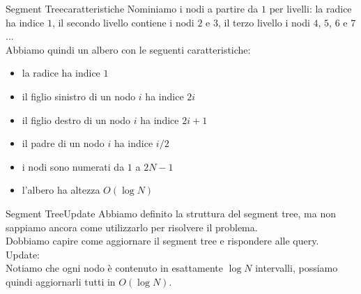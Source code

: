 \documentclass[compress]{beamer}
\begin{document}
\begin{frame}{Segment Tree}{caratteristiche}
    Nominiamo i nodi a partire da $1$ per livelli: la radice ha indice $1$, il secondo livello contiene i nodi $2$ e $3$, il terzo livello i nodi $4$, $5$, $6$ e $7$ ...\\
    \pause
    Abbiamo quindi un albero con le seguenti caratteristiche:\pause
    \begin{itemize}
        \item la radice ha indice $1$
        \item il figlio sinistro di un nodo $i$ ha indice $2i$
        \item il figlio destro di un nodo $i$ ha indice $2i + 1$
        \item il padre di un nodo $i$ ha indice $i/2$
        \item i nodi sono numerati da $1$ a $2N - 1$
        \item l'albero ha altezza $O(\log N)$
    \end{itemize}
\end{frame}

\begin{frame}
\end{frame}

\begin{frame}{Segment Tree}{Update}
    Abbiamo definito la struttura del segment tree, ma non sappiamo ancora come utilizzarlo per risolvere il problema.\\
    \pause
    Dobbiamo capire come aggiornare il segment tree e rispondere alle query.\\
    \pause
    Update:\\
    Notiamo che ogni nodo è contenuto in esattamente $\log N $ intervalli, possiamo quindi aggiornarli tutti in $O(\log N)$.
\end{frame}
\end{document}
